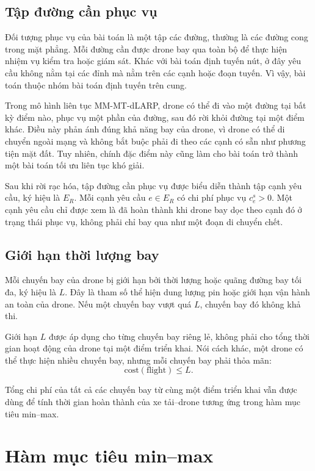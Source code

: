 \subsection{Tập đường cần phục vụ}

Đối tượng phục vụ của bài toán là một tập các đường, thường là các đường cong trong mặt phẳng. Mỗi đường cần được drone bay qua toàn bộ để thực hiện nhiệm vụ kiểm tra hoặc giám sát. Khác với bài toán định tuyến nút, ở đây yêu cầu không nằm tại các đỉnh mà nằm trên các cạnh hoặc đoạn tuyến. Vì vậy, bài toán thuộc nhóm bài toán định tuyến trên cung.

Trong mô hình liên tục MM-MT-dLARP, drone có thể đi vào một đường tại bất kỳ điểm nào, phục vụ một phần của đường, sau đó rời khỏi đường tại một điểm khác. Điều này phản ánh đúng khả năng bay của drone, vì drone có thể di chuyển ngoài mạng và không bắt buộc phải đi theo các cạnh có sẵn như phương tiện mặt đất. Tuy nhiên, chính đặc điểm này cũng làm cho bài toán trở thành một bài toán tối ưu liên tục khó giải.

Sau khi rời rạc hóa, tập đường cần phục vụ được biểu diễn thành tập cạnh yêu cầu, ký hiệu là $E_R$. Mỗi cạnh yêu cầu $e \in E_R$ có chi phí phục vụ $c^s_e > 0$. Một cạnh yêu cầu chỉ được xem là đã hoàn thành khi drone bay dọc theo cạnh đó ở trạng thái phục vụ, không phải chỉ bay qua như một đoạn di chuyển chết.

\subsection{Giới hạn thời lượng bay}

Mỗi chuyến bay của drone bị giới hạn bởi thời lượng hoặc quãng đường bay tối đa, ký hiệu là $L$. Đây là tham số thể hiện dung lượng pin hoặc giới hạn vận hành an toàn của drone. Nếu một chuyến bay vượt quá $L$, chuyến bay đó không khả thi.

Giới hạn $L$ được áp dụng cho từng chuyến bay riêng lẻ, không phải cho tổng thời gian hoạt động của drone tại một điểm triển khai. Nói cách khác, một drone có thể thực hiện nhiều chuyến bay, nhưng mỗi chuyến bay phải thỏa mãn:
\begin{equation}
\text{cost}(\text{flight}) \leq L.
\end{equation}

Tổng chi phí của tất cả các chuyến bay từ cùng một điểm triển khai vẫn được dùng để tính thời gian hoàn thành của xe tải--drone tương ứng trong hàm mục tiêu min--max.

\section{Hàm mục tiêu min--max}

